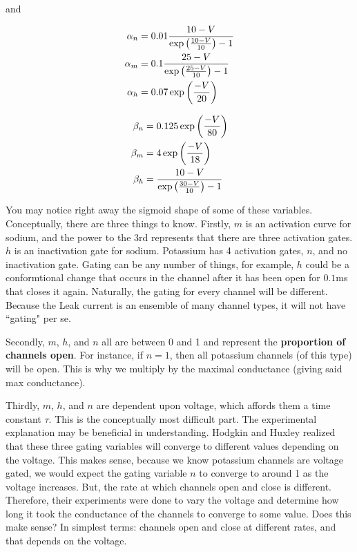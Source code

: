 and 

\begin{multicols}{2}
\begin{equation}
\begin{split}
    \alpha_n & = 0.01 \frac{10 - V}{\exp\left(\frac{10 - V}{10}\right) - 1} \\
    \alpha_m & = 0.1 \frac{25 - V}{\exp\left(\frac{25 - V}{10}\right) - 1} \\
    \alpha_h & = 0.07\exp\left(\frac{-V}{20}\right) \\
\end{split}
\end{equation}

\begin{equation}
\begin{split}
    \beta_n & = 0.125 \exp\left(\frac{-V}{80}\right) \\
    \beta_m & = 4 \exp\left(\frac{-V}{18}\right) \\
    \beta_h & = \frac{10 - V}{\exp\left(\frac{30 - V}{10}\right) - 1} \\
\end{split}
\end{equation}
\end{multicols}

You may notice right away the sigmoid shape of some of these variables. Conceptually, there are three things to know. Firstly, $m$ is an activation curve for sodium, and the power to the 3rd represents that there are three activation gates. $h$ is an inactivation gate for sodium. Potassium has 4 activation gates, $n$, and no inactivation gate. Gating can be any number of things, for example, $h$ could be a conformtional change that occurs in the channel after it has been open for $0.1$ms that closes it again. Naturally, the gating for every channel will be different. Because the Leak current is an ensemble of many channel types, it will not have ``gating" per se.\newline

Secondly, $m$, $h$, and $n$ all are between 0 and 1 and represent the \textbf{proportion of channels open}. For instance, if $n = 1$, then all potassium channels (of this type) will be open. This is why we multiply by the maximal conductance (giving said max conductance).\newline

Thirdly, $m$, $h$, and $n$ are dependent upon voltage, which affords them a time constant $\tau$. This is the conceptually most difficult part. The experimental explanation may be beneficial in understanding. Hodgkin and Huxley realized that these three gating variables will converge to different values depending on the voltage. This makes sense, because we know potassium channels are voltage gated, we would expect the gating variable $n$ to converge to around 1 as the voltage increases. But, the rate at which channels open and close is different. Therefore, their experiments were done to vary the voltage and determine how long it took the conductance of the channels to converge to some value. Does this make sense? In simplest terms: channels open and close at different rates, and that depends on the voltage.\newline

